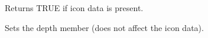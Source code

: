 

\label{wxiconok}


Returns TRUE if icon data is present.

\begin{comment}
\membersection{wxIcon::SaveFile}\label{wxiconsavefile}

\func{bool}{SaveFile}{\param{const wxString\& }{name}, \param{int}{ type}, \param{wxPalette* }{palette = NULL}}

Saves an icon in the named file.

\wxheading{Parameters}

\docparam{name}{A filename. The meaning of {\it name} is determined by the {\it type} parameter.}

\docparam{type}{One of the following values:

\twocolwidtha{5cm}
\begin{twocollist}
\twocolitem{{\bf wxBITMAP\_TYPE\_ICO}}{Save a Windows icon file.}
\twocolitem{{\bf wxBITMAP\_TYPE\_XPM}}{Save an XPM bitmap file.}
\end{twocollist}

The validity of these flags depends on the platform and wxWidgets configuration.}

\docparam{palette}{An optional palette used for saving the icon.}

\wxheading{Return value}

TRUE if the operation succeeded, FALSE otherwise.

\wxheading{Remarks}

Depending on how wxWidgets has been configured, not all formats may be available.

\wxheading{See also}

\helpref{wxIcon::LoadFile}{wxiconloadfile}
\end{comment}

\label{wxiconsetdepth}


Sets the depth member (does not affect the icon data).



